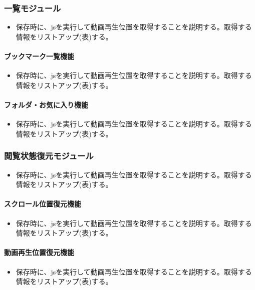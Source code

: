 \subsubsection{一覧モジュール}
\begin{itemize}
  \item 保存時に、jsを実行して動画再生位置を取得することを説明する。取得する情報をリストアップ(表)する。
\end{itemize}

\paragraph{ブックマーク一覧機能}
\begin{itemize}
  \item 保存時に、jsを実行して動画再生位置を取得することを説明する。取得する情報をリストアップ(表)する。
\end{itemize}

\paragraph{フォルダ・お気に入り機能}
\begin{itemize}
  \item 保存時に、jsを実行して動画再生位置を取得することを説明する。取得する情報をリストアップ(表)する。
\end{itemize}

\subsubsection{閲覧状態復元モジュール}
\begin{itemize}
  \item 保存時に、jsを実行して動画再生位置を取得することを説明する。取得する情報をリストアップ(表)する。
\end{itemize}

\paragraph{スクロール位置復元機能}
\begin{itemize}
  \item 保存時に、jsを実行して動画再生位置を取得することを説明する。取得する情報をリストアップ(表)する。
\end{itemize}

\paragraph{動画再生位置復元機能}
\begin{itemize}
  \item 保存時に、jsを実行して動画再生位置を取得することを説明する。取得する情報をリストアップ(表)する。
\end{itemize}

